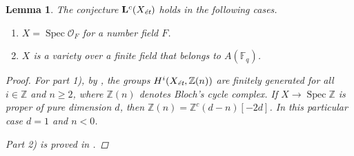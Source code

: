 \documentclass[leqno,12pt]{article}
\theoremstyle{plain}
\newtheorem{lemma}[theorem]{\indent\sc Lemma}
\theoremstyle{definition}
\DeclareMathOperator{\Spec}{Spec}
\newcommand{\FF}{\mathbb{F}}
\newcommand{\ZZ}{\mathbb{Z}}
\newcommand{\et}{\text{\it \'{e}t}}
\begin{document}
\begin{lemma}
  \label{lemma:Lc(Xet)-holds-for-OF-and-A(Fq)}
  The conjecture $\mathbf{L}^c (X_\et)$ holds in the following cases.

  \begin{enumerate}
  \item[$1)$] $X = \Spec \mathcal{O}_F$ for a number field $F$.

  \item[$2)$] $X$ is a variety over a finite field that belongs to $A (\FF_q)$.
  \end{enumerate}

  \begin{proof}
    For part 1), by \cite[Theorem~5.1~(b)]{Morin-2014}, the groups
    $H^i (X_\et, \ZZ(n))$ are finitely generated for all $i \in \ZZ$ and
    $n \ge 2$, where $\ZZ (n)$ denotes Bloch's cycle complex. If
    $X \to \Spec \ZZ$ is proper of pure dimension $d$, then
    $\ZZ (n) = \ZZ^c (d-n) [-2d]$. In this particular case $d = 1$ and $n < 0$.

    Part 2) is proved in \cite[Proposition~5.7]{Morin-2014}.
  \end{proof}
\end{lemma}
\end{document}
